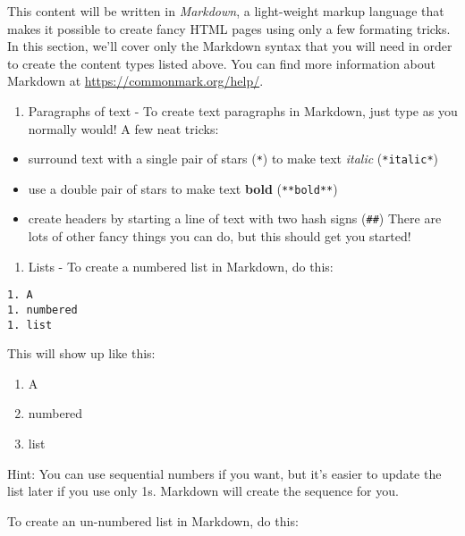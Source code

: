 \documentclass[
]{book}
\providecommand{\tightlist}{%
  \setlength{\itemsep}{0pt}\setlength{\parskip}{0pt}}
\begin{document}
This content will be written in \emph{Markdown}, a light-weight markup language that makes it possible to create
fancy HTML pages using only a few formating tricks. In this section, we'll cover only the Markdown syntax that
you will need in order to create the content types listed above. You can find more information about Markdown
at \url{https://commonmark.org/help/}.

\begin{enumerate}
\def\labelenumi{\arabic{enumi}.}
\tightlist
\item
  Paragraphs of text - To create text paragraphs in Markdown, just type as you normally would! A few neat tricks:
\end{enumerate}

\begin{itemize}
\tightlist
\item
  surround text with a single pair of stars (\texttt{*}) to make text \emph{italic} (\texttt{*italic*})
\item
  use a double pair of stars to make text \textbf{bold} (\texttt{**bold**})
\item
  create headers by starting a line of text with two hash signs (\texttt{\#\#})
  There are lots of other fancy things you can do, but this should get you started!
\end{itemize}

\begin{enumerate}
\def\labelenumi{\arabic{enumi}.}
\tightlist
\item
  Lists - To create a numbered list in Markdown, do this:
\end{enumerate}

\begin{verbatim}
1. A
1. numbered
1. list
\end{verbatim}

This will show up like this:

\begin{enumerate}
\def\labelenumi{\arabic{enumi}.}
\tightlist
\item
  A
\item
  numbered
\item
  list
\end{enumerate}

Hint: You can use sequential numbers if you want, but it's easier to update the list later if you use only 1s.
Markdown will create the sequence for you.

To create an un-numbered list in Markdown, do this:
\end{document}
